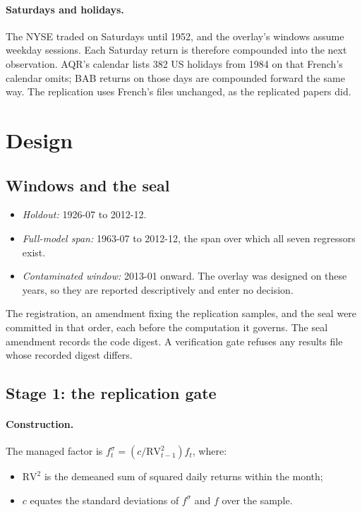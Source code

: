 \documentclass[11pt]{article}
\begin{document}
\paragraph{Saturdays and holidays.} The NYSE traded on Saturdays until 1952,
and the overlay's windows assume weekday sessions. Each Saturday return is
therefore compounded into the next observation. AQR's calendar lists 382 US
holidays from 1984 on that French's calendar omits; BAB returns on those days
are compounded forward the same way. The replication uses French's files
unchanged, as the replicated papers did.

\section{Design}

\subsection{Windows and the seal}
\begin{itemize}
\item \emph{Holdout:} 1926-07 to 2012-12.
\item \emph{Full-model span:} 1963-07 to 2012-12, the span over which all
  seven regressors exist.
\item \emph{Contaminated window:} 2013-01 onward. The overlay was designed
  on these years, so they are reported descriptively and enter no decision.
\end{itemize}

The registration, an amendment fixing the replication samples, and the seal
were committed in that order, each before the computation it governs. The
seal amendment records the code digest. A verification gate refuses any
results file whose recorded digest differs.

\subsection{Stage 1: the replication gate}

\paragraph{Construction.} The managed factor is
$f^\sigma_t = (c/\mathrm{RV}^2_{t-1}) f_t$, where:
\begin{itemize}
\item $\mathrm{RV}^2$ is the demeaned sum of squared daily returns within
  the month;
\item $c$ equates the standard deviations of $f^\sigma$ and $f$ over the
  sample.
\end{itemize}
\end{document}
